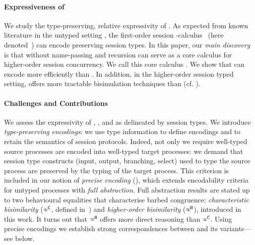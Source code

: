 \documentclass[runningheads]{llncs}
\begin{document}
\paragraph{Expressiveness of \HOp}
We study the type-preserving, 
relative expressivity of \HOp. %
As expected from 
known literature in the untyped setting \cite{SangiorgiD:expmpa}, 
the first-order session \sessp-calculus~\cite{honda.vasconcelos.kubo:language-primitives} {(here denoted~\sessp)} 
can encode  
\HOp preserving session types. 
In this paper, 
our \emph{main discovery} is 
that 
\HOp 
without
name-passing and recursion
can serve as a 
core calculus    
for higher-order session concurrency.  
We call this core calculus \HO. 
We show that \HO can encode \HOp more efficiently 
than \sessp. In addition, in the higher-order session typed setting, 
\HO offers more tractable bisimulation techniques 
than \sessp (cf. ).



\paragraph{Challenges and Contributions}

We assess the expressivity  of \HOp, \HO, and \sessp as delineated by session types. 
We introduce \emph{type-preserving encodings}:
we use type information to define encodings
and to retain the semantics of session protocols. 
Indeed,  not only we require 
well-typed source processes are encoded into 
well-typed target processes: 
we demand that session type constructs (input, output, branching, select) used to type the source process
are preserved by the typing of the target process.
This criterion is included in 
our notion of \emph{precise encoding} (), which 
extends encodability criteria for untyped processes with 
\emph{full abstraction}.
{Full abstraction results are stated
up to two
behavioural equalities that characterise barbed congruence:
\emph{characteristic bisimilarity} ($\approx^\mathtt{C}$, defined in~\cite{characteristic_bis})
and 
\emph{higher-order bisimilarity} ($\approx^\mathtt{H}$), introduced in this
work.
It turns out that $\approx^\mathtt{H}$ offers more direct  reasoning than $\approx^\mathtt{C}$. }
Using precise encodings we establish strong correspondences between 
\HOp and its variants---see 
below.
\end{document}
